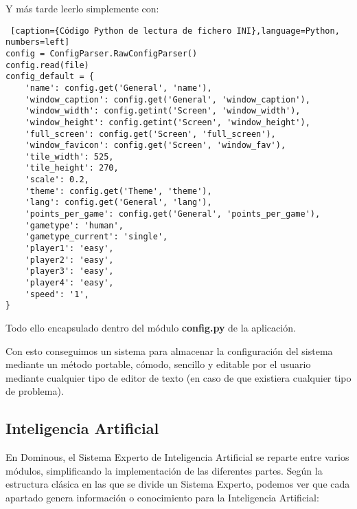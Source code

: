 Y más tarde leerlo simplemente con:

\begin{lstlisting} [caption={Código Python de lectura de fichero INI},language=Python, numbers=left]
config = ConfigParser.RawConfigParser()
config.read(file)
config_default = {
    'name': config.get('General', 'name'),
    'window_caption': config.get('General', 'window_caption'),
    'window_width': config.getint('Screen', 'window_width'),
    'window_height': config.getint('Screen', 'window_height'),
    'full_screen': config.get('Screen', 'full_screen'),
    'window_favicon': config.get('Screen', 'window_fav'),
    'tile_width': 525,
    'tile_height': 270,
    'scale': 0.2,
    'theme': config.get('Theme', 'theme'),
    'lang': config.get('General', 'lang'),
    'points_per_game': config.get('General', 'points_per_game'),
    'gametype': 'human',
    'gametype_current': 'single',
    'player1': 'easy',
    'player2': 'easy',
    'player3': 'easy',
    'player4': 'easy',
    'speed': '1',
}
\end{lstlisting}

Todo ello encapsulado dentro del módulo \textbf{config.py} de la aplicación.

Con esto conseguimos un sistema para almacenar la configuración del sistema mediante un método portable, cómodo, sencillo y 
editable por el usuario mediante cualquier tipo de editor de texto (en caso de que existiera cualquier tipo de problema).

\subsection{Inteligencia Artificial}

En Dominous, el Sistema Experto de Inteligencia Artificial se reparte entre varios módulos, simplificando la implementación
de las diferentes partes. Según la estructura clásica en las que se divide un Sistema Experto, podemos ver que cada
apartado genera información o conocimiento para la Inteligencia Artificial:

